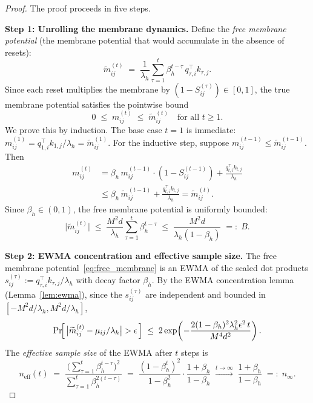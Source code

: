 \documentclass{article}
\begin{document}
\begin{proof}
The proof proceeds in five steps.

\medskip
\noindent\textbf{Step 1: Unrolling the membrane dynamics.}
Define the \emph{free membrane potential}
(the membrane potential that would accumulate in the absence of resets):
\begin{equation}\label{eq:free_membrane}
  \widetilde{m}_{ij}^{(t)}
  \;=\; \frac{1}{\lambda_h}\sum_{\tau=1}^{t}
    \beta_h^{t-\tau} \, q_{\tau,i}^\top k_{\tau,j}.
\end{equation}
Since each reset multiplies the membrane by $(1 - S_{ij}^{(\tau)}) \in [0,1]$,
the true membrane potential satisfies the pointwise bound
\begin{equation}\label{eq:membrane_bound}
  0 \;\le\; m_{ij}^{(t)} \;\le\; \widetilde{m}_{ij}^{(t)}
  \quad \text{for all } t \ge 1.
\end{equation}
We prove this by induction.  The base case $t = 1$ is immediate:
$m_{ij}^{(1)} = q_{1,i}^\top k_{1,j}/\lambda_h = \widetilde{m}_{ij}^{(1)}$.
For the inductive step, suppose $m_{ij}^{(t-1)} \le \widetilde{m}_{ij}^{(t-1)}$.
Then
\begin{align*}
  m_{ij}^{(t)}
  &= \beta_h \, m_{ij}^{(t-1)} \cdot (1 - S_{ij}^{(t-1)})
     + \frac{q_{t,i}^\top k_{t,j}}{\lambda_h}\\
  &\le \beta_h \, \widetilde{m}_{ij}^{(t-1)}
     + \frac{q_{t,i}^\top k_{t,j}}{\lambda_h}
   = \widetilde{m}_{ij}^{(t)}.
\end{align*}
Since $\beta_h \in (0,1)$, the free membrane potential is uniformly bounded:
\[
  \bigl|\widetilde{m}_{ij}^{(t)}\bigr|
  \;\le\; \frac{M^2 d}{\lambda_h} \sum_{\tau=1}^{t} \beta_h^{t-\tau}
  \;\le\; \frac{M^2 d}{\lambda_h(1 - \beta_h)}
  \;=:\; B.
\]

\medskip
\noindent\textbf{Step 2: EWMA concentration and effective sample size.}
The free membrane potential~\eqref{eq:free_membrane} is an EWMA of the
scaled dot products $s_{ij}^{(\tau)} := q_{\tau,i}^\top k_{\tau,j} / \lambda_h$
with decay factor $\beta_h$.  By the EWMA concentration lemma
(Lemma~\ref{lem:ewma}), since the $s_{ij}^{(\tau)}$ are independent
and bounded in $[-M^2 d / \lambda_h, M^2 d / \lambda_h]$,
\begin{equation}\label{eq:ewma_conc}
  \Pr\!\Bigl[\,\bigl|\widetilde{m}_{ij}^{(t)} - \mu_{ij}/\lambda_h\bigr|
    > \epsilon\,\Bigr]
  \;\le\; 2\exp\!\left(-\frac{2(1-\beta_h)^2 \lambda_h^2 \epsilon^2 \, t}
    {M^4 d^2}\right).
\end{equation}
The \emph{effective sample size} of the EWMA after $t$ steps is
\[
  n_{\mathrm{eff}}(t)
  \;=\; \frac{\bigl(\sum_{\tau=1}^t \beta_h^{t-\tau}\bigr)^2}
    {\sum_{\tau=1}^t \beta_h^{2(t-\tau)}}
  \;=\; \frac{(1 - \beta_h^t)^2}{1 - \beta_h^2}
    \cdot \frac{1+\beta_h}{1-\beta_h}
  \;\xrightarrow{t \to \infty}\; \frac{1+\beta_h}{1-\beta_h}
  \;=:\; n_\infty.
\]


\end{proof}
\end{document}
